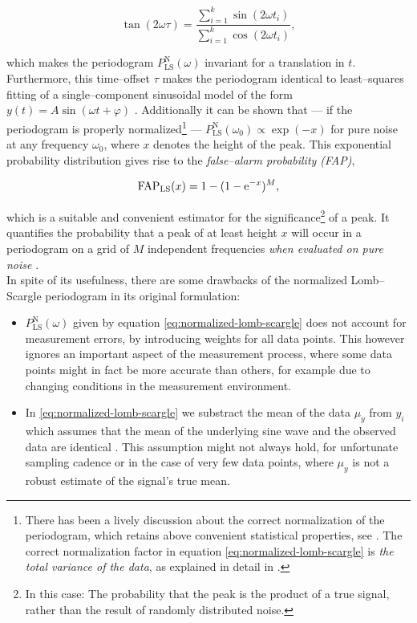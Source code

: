 \begin{equation}
\tan(2 \omega \tau) = \frac{\sum\limits_{i=1}^k \sin(2 \omega t_i)}{\sum\limits_{i=1}^k \cos(2 \omega t_i)},
\end{equation}

which makes the periodogram $P^{\text{N}}_{\text{LS}}(\omega)$ invariant for a translation in $t$. Furthermore, this time--offset $\tau$ makes the periodogram identical to least--squares fitting of a single--component sinusoidal model of the form $y(t) = A \sin(\omega t + \varphi)$ \citep{horne1986, vanderplas2015}. Additionally it can be shown that --- if the periodogram is properly normalized\footnote{There has been a lively discussion about the correct normalization of the periodogram, which retains above convenient statistical properties, see \citet{lomb1976,astroML,zechmeister2009}. The correct normalization factor in equation \eqref{eq:normalized-lomb-scargle} is \emph{the total variance of the data}, as explained in detail in \citet{horne1986}.} --- $P^{\text{N}}_{\text{LS}}(\omega_0) \propto \exp(-x)$ for pure noise at any frequency $\omega_0$, where $x$ denotes the height of the peak. This exponential probability distribution gives rise to the \emph{false--alarm probability (FAP)},

\begin{equation}
\text{FAP}_{\text{LS}}(x) = 1 - (1 - \mathrm{e}^{-x})^M,
\end{equation}

which is a suitable and convenient estimator for the significance\footnote{In this case: The probability that the peak is the product of a true signal, rather than the result of randomly distributed noise.} of a peak. It quantifies the probability that a peak of at least height $x$ will occur in a periodogram on a grid of $M$ independent frequencies \emph{when evaluated on pure noise} \citep{horne1986}.\\

In spite of its usefulness, there are some drawbacks of the normalized Lomb--Scargle periodogram in its original formulation:

\begin{itemize}
\item $P^{\text{N}}_{\text{LS}}(\omega)$ given by equation \eqref{eq:normalized-lomb-scargle} does not account for measurement errors, \eg by introducing weights for all data points. This however ignores an important aspect of the measurement process, where some data points might in fact be more accurate than others, for example due to changing conditions in the measurement environment.
\item In \eqref{eq:normalized-lomb-scargle} we substract the mean of the data $\mu_y$ from $y_i$ which assumes that the mean of the underlying sine wave and the observed data are identical \citep{cumming1999}. This assumption might not always hold, \eg for unfortunate sampling cadence or in the case of very few data points, where $\mu_y$ is not a robust estimate of the signal's true mean.
\end{itemize}

